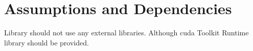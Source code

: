 \section{Assumptions and Dependencies}

	{
		Library should not use any external libraries. Although \gls{cuda} Toolkit Runtime library should be provided.
	}